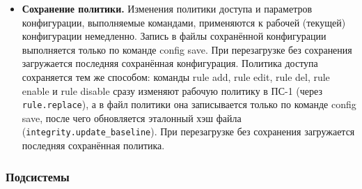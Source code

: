 \documentclass[13pt,a4paper,final]{article}
\begin{document}
\begin{itemize}
		\item \textbf{Сохранение политики.} Изменения политики доступа и параметров конфигурации, выполняемые командами, применяются к рабочей (текущей) конфигурации немедленно. Запись в файлы сохранённой конфигурации выполняется только по команде config save. При перезагрузке без сохранения загружается последняя сохранённая конфигурация. \textcolor{edit}{Политика доступа сохраняется тем же способом: команды rule add, rule edit, rule del, rule enable и rule disable сразу изменяют рабочую политику в ПС-1 (через \texttt{rule.replace}), а в файл политики она записывается только по команде config save, после чего обновляется эталонный хэш файла (\texttt{integrity.update\_baseline}). При перезагрузке без сохранения загружается последняя сохранённая политика.}
	\end{itemize}
	
	\subsubsection{Подсистемы}
	
\end{document}

